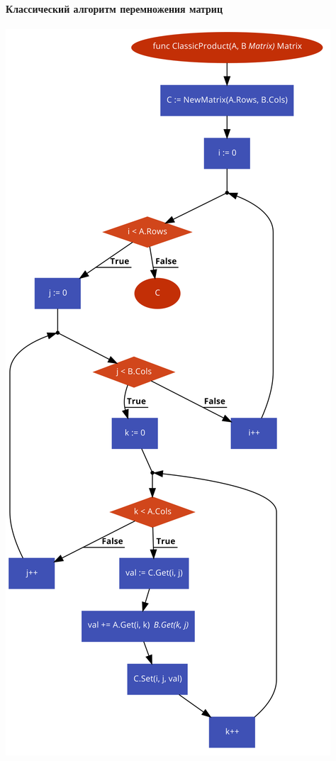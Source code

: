\documentclass[utf8x, 12pt]{G7-32} %
\begin{document}
\paragraph{Классический алгоритм перемножения матриц}
\begin{center}
	\includegraphics[scale=0.32]{images/matrixClassic.png}
\end{center}
\end{document}
